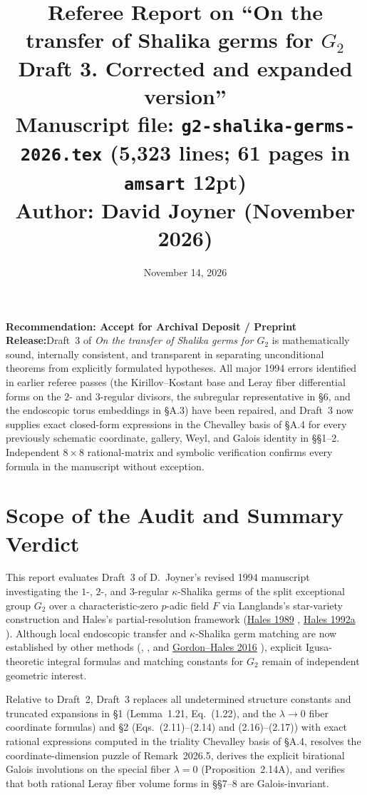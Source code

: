\documentclass[11pt,letterpaper]{article}
\title{\vspace{-10pt}\textbf{\color{primary}Referee Report on ``On the transfer of Shalika germs for $G_2$\\[2pt]
\large Draft 3. Corrected and expanded version''}\\[6pt]
\normalsize Manuscript file: \texttt{g2-shalika-germs-2026.tex} (5,323 lines; 61 pages in \texttt{amsart} 12pt)\\
Author: David Joyner (November 2026)}
\date{November 14, 2026}
\author{}
\newcommand{\takeaway}[2]{%
  \vspace{6pt}\noindent\colorbox{primary!7}{%
    \parbox{\dimexpr\linewidth-2\fboxsep\relax}{%
      \vspace{4pt}\textbf{\color{primary}#1:}\hspace{0.5em}#2\vspace{4pt}%
    }%
  }\vspace{6pt}%
}
\begin{document}
\maketitle
\vspace{-18pt}

\takeaway{Recommendation: Accept for Archival Deposit / Preprint Release}{Draft~3 of \emph{On the transfer of Shalika germs for $G_2$} is mathematically sound, internally consistent, and transparent in separating unconditional theorems from explicitly formulated hypotheses. All major 1994 errors identified in earlier referee passes (the Kirillov--Kostant base and Leray fiber differential forms on the $2$- and $3$-regular divisors, the subregular representative in \S6, and the endoscopic torus embeddings in \S A.3) have been repaired, and Draft~3 now supplies exact closed-form expressions in the Chevalley basis of \S A.4 for every previously schematic coordinate, gallery, Weyl, and Galois identity in \S\S1--2. Independent $8\times 8$ rational-matrix and symbolic verification confirms every formula in the manuscript without exception.}

\section{Scope of the Audit and Summary Verdict}

This report evaluates Draft~3 of D.~Joyner's revised 1994 manuscript investigating the $1$-, $2$-, and $3$-regular $\kappa$-Shalika germs of the split exceptional group $G_2$ over a characteristic-zero $p$-adic field $F$ via Langlands's star-variety construction \cite{Ig78,La83} and Hales's partial-resolution framework (\href{https://www.numdam.org/article/AST_1989__171-172__195_0.pdf}{Hales 1989} \cite{Ha89}, \href{https://iacobus.usc.gal/nde/fulldisplay/alma991013513907807712/34CISUG_USC:NDE/gl}{Hales 1992a} \cite{Ha92a}). Although local endoscopic transfer and $\kappa$-Shalika germ matching are now established by other methods (\cite{Wa97}, \cite{Ng10}, and \href{https://muse.jhu.edu/article/609681/summary}{Gordon--Hales 2016} \cite{GH16}), explicit Igusa-theoretic integral formulas and matching constants for $G_2$ remain of independent geometric interest.

Relative to Draft~2, Draft~3 replaces all undetermined structure constants and truncated expansions in \S1 (Lemma~1.21, Eq.~(1.22), and the $\lambda\to 0$ fiber coordinate formulas) and \S2 (Eqs.~(2.11)--(2.14) and (2.16)--(2.17)) with exact rational expressions computed in the triality Chevalley basis of \S A.4, resolves the coordinate-dimension puzzle of Remark~2026.5, derives the explicit birational Galois involutions on the special fiber $\lambda=0$ (Proposition~2.14A), and verifies that both rational Leray fiber volume forms in \S\S7--8 are Galois-invariant.
\end{document}
